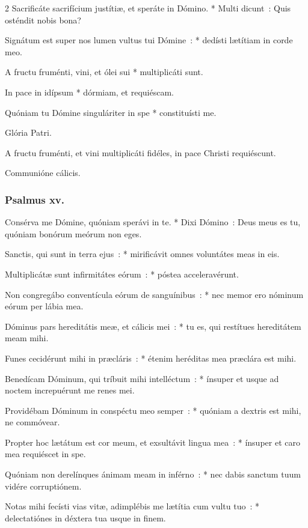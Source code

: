 \documentclass[9pt,twoside]{extarticle}
\begin{document}
\begin{multicols}{2}
Sacrificáte sacrifícium justítiæ, et speráte in Dómino. * Multi dicunt~: Quis osténdit nobis bona?

Signátum est super nos lumen vultus tui Dómine~: * dedísti lætítiam in corde meo.

A fructu fruménti, vini, et ólei sui * multiplicáti sunt.

In pace in idípsum * dórmiam, et requiéscam.

Quóniam tu Dómine singuláriter in spe * constituísti me.

Glória Patri.

\begin{tightlist}{}
\item {} A fructu fruménti, et vini multiplicáti fidéles, in pace Christi requiéscunt.
\item {} Communióne cálicis.
\end{tightlist}
\subsubsection*{\center Psalmus xv.}
\lettrine{C}onsérva me Dómine, quóniam sperávi in te. * Dixi Dómino~: Deus meus es tu, quóniam bonórum meórum non eges.

Sanctis, qui sunt in terra ejus~: * mirificávit omnes voluntátes meas in eis.

Multiplicátæ sunt infirmitátes eórum~: * póstea acceleravérunt.

Non congregábo conventícula eórum de sanguínibus~: * nec memor ero nóminum eórum per lábia mea.

Dóminus pars hereditátis meæ, et cálicis mei~: * tu es, qui restítues hereditátem meam mihi.

Funes cecidérunt mihi in præcláris~: * étenim heréditas mea præclára est mihi.

Benedícam Dóminum, qui tríbuit mihi intelléctum~: * ínsuper et usque ad noctem increpuérunt me renes mei.

Providébam Dóminum in conspéctu meo semper~: * quóniam a dextris est mihi, ne commóvear.

Propter hoc lætátum est cor meum, et exsultávit lingua mea~: * ínsuper et caro mea requiéscet in spe.

Quóniam non derelínques ánimam meam in inférno~: * nec dabis sanctum tuum vidére corruptiónem.

Notas mihi fecísti vias vitæ, adimplébis me lætítia cum vultu tuo~: * delectatiónes in déxtera tua usque in finem.


\end{multicols}
\end{document}
